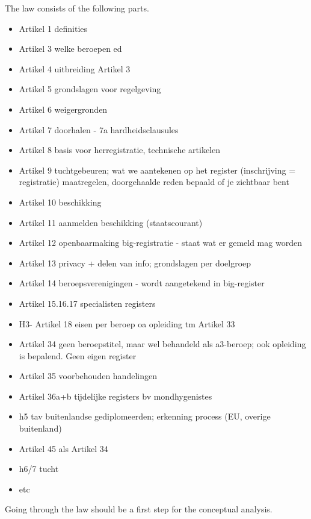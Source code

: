 The law consists of the following parts.
\begin{itemize}
    \item Artikel 1 definities 
    \item Artikel 3 welke beroepen ed
    \item Artikel 4 uitbreiding Artikel 3
    \item Artikel 5 grondslagen voor regelgeving
    \item Artikel 6 weigergronden
    \item Artikel 7 doorhalen - 7a hardheidsclausules
    \item Artikel 8 basis voor herregistratie, technische artikelen
    \item Artikel 9 tuchtgebeuren; wat we aantekenen op het register (inschrijving = registratie) maatregelen, doorgehaalde reden bepaald of je zichtbaar bent 
    \item Artikel 10 beschikking
    \item Artikel 11 aanmelden beschikking (staatscourant)
    \item Artikel 12 openbaarmaking big-registratie - staat wat er gemeld mag worden
    \item Artikel 13 privacy + delen van info; grondslagen per doelgroep
    \item Artikel 14 beroepsverenigingen - wordt aangetekend in big-register
    \item Artikel 15.16.17 specialisten registers
    \item H3- Artikel 18 eisen per beroep oa opleiding tm Artikel 33
    \item Artikel 34 geen beroepstitel, maar wel behandeld als a3-beroep; ook opleiding is bepalend. Geen eigen register
    \item Artikel 35 voorbehouden handelingen
    \item Artikel 36a+b tijdelijke registers bv mondhygenistes
    \item h5 tav buitenlandse gediplomeerden; erkenning process (EU, overige buitenland)
    \item Artikel 45 als Artikel 34
    \item h6/7 tucht
    \item etc

\end{itemize}
Going through the law should be a first step for the conceptual analysis.